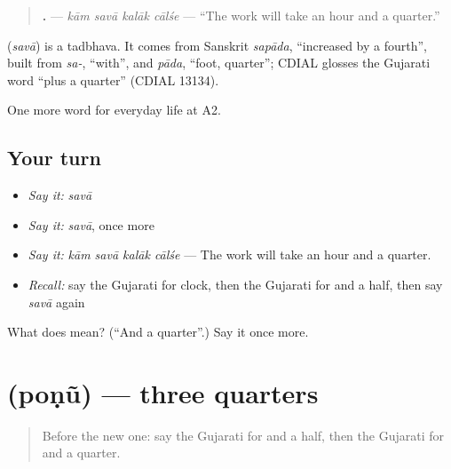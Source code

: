 \begin{quote}
\textbf{   .} — \emph{kām savā kalāk cālśe} — \textquotedblleft{}The work will take an hour and a quarter.\textquotedblright{}
\end{quote}

\begin{cousinweb}
\textbf{} (\emph{savā}) is a tadbhava. It comes from Sanskrit \emph{sapāda}, \textquotedblleft{}increased by a fourth\textquotedblright{}, built from \emph{sa-}, \textquotedblleft{}with\textquotedblright{}, and \emph{pāda}, \textquotedblleft{}foot, quarter\textquotedblright{}; CDIAL glosses the Gujarati word \textquotedblleft{}plus a quarter\textquotedblright{} (CDIAL 13134).
\end{cousinweb}

\begin{grammarlens}[title={What you've built}]
One more word for everyday life at A2.
\end{grammarlens}

\subsection*{Your turn}
\begin{itemize}
\raggedright
  \item \emph{Say it:} \emph{savā}
  \item \emph{Say it:} \emph{savā}, once more
  \item \emph{Say it:} \emph{kām savā kalāk cālśe} — The work will take an hour and a quarter.
  \item \emph{Recall:} say the Gujarati for clock, then the Gujarati for and a half, then say \emph{savā} again
\end{itemize}

\begin{tcolorbox}[breakable,colback=teal!4,colframe=teal!35!black,title={Before you move on}]
What does  mean? (\textquotedblleft{}And a quarter\textquotedblright{}.) Say it once more.
\end{tcolorbox}
\section[\texorpdfstring{\gu{પોણું} (poṇũ)}{પોણું (poṇũ)}]{ (poṇũ) — three quarters}

\label{lesson:GU-C176-ponu}



\begin{quote}
Before the new one: say the Gujarati for and a half, then the Gujarati for and a quarter.
\end{quote}


